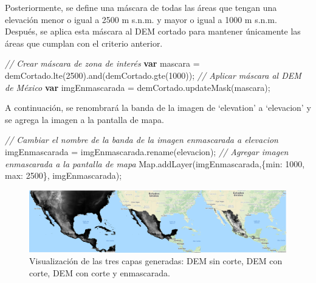 \documentclass[
  12pt,
  letterpaper,
  twoside]{book}
\newenvironment{Shaded}{\begin{snugshade}}{\end{snugshade}}
\newcommand{\CommentTok}[1]{\textcolor[rgb]{0.24,0.58,0.00}{\textit{#1}}}
\newcommand{\ControlFlowTok}[1]{\textcolor[rgb]{0.00,0.00,0.00}{\textbf{#1}}}
\newcommand{\DataTypeTok}[1]{\textcolor[rgb]{0.00,0.00,0.00}{#1}}
\newcommand{\DecValTok}[1]{\textcolor[rgb]{0.28,0.53,0.93}{#1}}
\newcommand{\FunctionTok}[1]{\textcolor[rgb]{0.48,0.12,0.64}{#1}}
\newcommand{\KeywordTok}[1]{\textcolor[rgb]{0.48,0.12,0.64}{#1}}
\newcommand{\NormalTok}[1]{#1}
\newcommand{\OperatorTok}[1]{\textcolor[rgb]{0.00,0.00,0.00}{#1}}
\newcommand{\StringTok}[1]{\textcolor[rgb]{0.87,0.29,0.22}{#1}}
\begin{document}
Posteriormente, se define una máscara de todas las áreas que tengan una elevación menor o igual a 2500 m s.n.m. y mayor o igual a 1000 m s.n.m. Después, se aplica esta máscara al DEM cortado para mantener únicamente las áreas que cumplan con el criterio anterior.

\begin{Shaded}
\begin{Highlighting}[]
\CommentTok{// Crear máscara de zona de interés}
\ControlFlowTok{var}\NormalTok{ mascara }\OperatorTok{=}\NormalTok{ demCortado}\OperatorTok{.}\FunctionTok{lte}\NormalTok{(}\DecValTok{2500}\NormalTok{)}\OperatorTok{.}\FunctionTok{and}\NormalTok{(demCortado}\OperatorTok{.}\FunctionTok{gte}\NormalTok{(}\DecValTok{1000}\NormalTok{))}\OperatorTok{;}
\CommentTok{// Aplicar máscara al DEM de México}
\ControlFlowTok{var}\NormalTok{ imgEnmascarada }\OperatorTok{=}\NormalTok{ demCortado}\OperatorTok{.}\FunctionTok{updateMask}\NormalTok{(mascara)}\OperatorTok{;}
\end{Highlighting}
\end{Shaded}

A continuación, se renombrará la banda de la imagen de `elevation' a `elevacion' y se agrega la imagen a la pantalla de mapa.

\begin{Shaded}
\begin{Highlighting}[]
\CommentTok{// Cambiar el nombre de la banda de la imagen enmascarada a elevacion}
\NormalTok{imgEnmascarada }\OperatorTok{=}\NormalTok{ imgEnmascarada}\OperatorTok{.}\FunctionTok{rename}\NormalTok{(}\StringTok{\textquotesingle{}elevacion\textquotesingle{}}\NormalTok{)}\OperatorTok{;}
\CommentTok{// Agregar imagen enmascarada a la pantalla de mapa}
\KeywordTok{Map}\OperatorTok{.}\FunctionTok{addLayer}\NormalTok{(imgEnmascarada}\OperatorTok{,}\NormalTok{\{}\DataTypeTok{min}\OperatorTok{:} \DecValTok{1000}\OperatorTok{,} \DataTypeTok{max}\OperatorTok{:} \DecValTok{2500}\NormalTok{\}}\OperatorTok{,} \StringTok{\textquotesingle{}imgEnmascarada\textquotesingle{}}\NormalTok{)}\OperatorTok{;}
\end{Highlighting}
\end{Shaded}

\begin{figure}[H]

{\centering \includegraphics[width=0.95\linewidth]{Img/ejercicioAMaps} 

}

\caption{Visualización de las tres capas generadas: DEM sin corte, DEM con corte, DEM con corte y enmascarada.}\label{fig:unnamed-chunk-88}
\end{figure}
\end{document}
